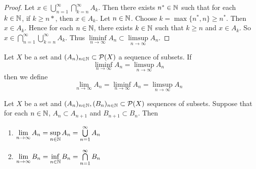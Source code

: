 \documentclass{book}
\begin{document}
	\begin{proof}
		Let $x \in \bigcup\limits_{n=1}^{\infty} \bigcap\limits_{k =n}^{\infty} A_k$. Then there exists $n^* \in \mathbb{N}$ such that for each $k \in \mathbb{N}$, if $k \geq n*$, then $x \in A_k$. Let $n \in \mathbb{N}$. Choose $k = \max\{n^*,n\} \geq n^*$. Then $x \in A_k$. Hence for each $n \in \mathbb{N}$, there exists $k \in \mathbb{N}$ such that $k \geq n$ and $x \in A_k$. So $x \in \bigcap\limits_{n=1}^{\infty} \bigcup\limits_{k=n}^{\infty} A_k$. Thus $\liminf\limits_{n \rightarrow \infty}A_n \subset \limsup\limits_{n \rightarrow \infty}A_n$.
	\end{proof}
	
	\begin{defn}  
		Let $X$ be a set and $(A_n)_{n \in \mathbb{N}} \subset \mathcal{P}(X)$ a sequence of subsets. If $$\liminf_{n \rightarrow \infty} A_n = \limsup_{n \rightarrow \infty} A_n$$ then we define $$\lim_{n \rightarrow \infty}A_n = \liminf_{n \rightarrow \infty} A_n = \limsup_{n \rightarrow \infty} A_n$$ 
	\end{defn}
	
	\begin{ex}  
		Let $X$ be a set and $(A_n)_{n \in \mathbb{N}}, (B_n)_{n \in \mathbb{N}} \subset \mathcal{P}(X)$ sequences of subsets. Suppose that for each $n \in \mathbb{N}$, $A_n \subset A_{n+1}$ and $B_{n+1} \subset B_n$. Then 
		\begin{enumerate}
			\item $\lim \limits_{n \rightarrow \infty} A_n = \sup\limits_{n \in \mathbb{N}}A_n = \bigcup\limits_{n=1}^{\infty}A_n$
			\item $\lim \limits_{n \rightarrow \infty} B_n = \inf\limits_{n \in \mathbb{N}}B_n = \bigcap\limits_{n=1}^{\infty}B_n$
		\end{enumerate}
	\end{ex}
	
\end{document}
